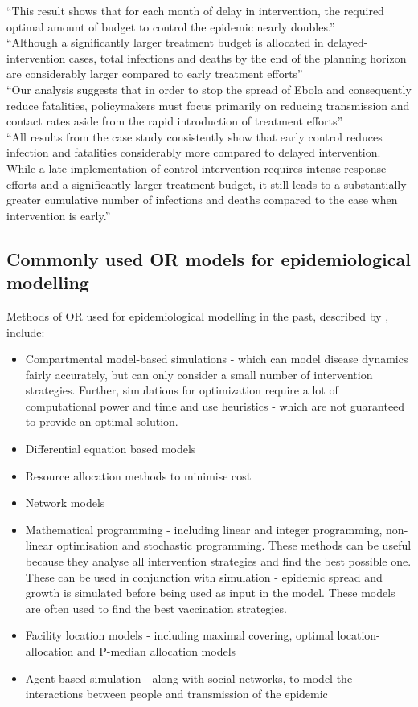 ``This result shows that for each month of delay in intervention, the required optimal amount of budget to control the epidemic nearly doubles.”\\
``Although a significantly larger treatment budget is allocated in delayed-intervention cases, total infections and deaths by the end of the planning horizon are considerably larger compared to early treatment efforts”\\
``Our analysis suggests that in order to stop the spread of Ebola and consequently reduce fatalities, policymakers must focus primarily on reducing transmission and contact rates aside from the rapid introduction of treatment efforts”\\
``All results from the case study consistently show that early control reduces infection and fatalities considerably more compared to delayed intervention. While a late implementation of control intervention requires intense response efforts and a significantly larger treatment budget, it still leads to a substantially greater cumulative number of infections and deaths compared to the case when intervention is early.”\\

\subsection{Commonly used OR models for epidemiological modelling}
Methods of OR used for epidemiological modelling in the past, described by \cite{buyuktahtakin2018new}, include:
\begin{itemize}
    \item Compartmental model-based simulations - which can model disease dynamics fairly accurately, but can only consider a small number of intervention strategies. Further, simulations for optimization require a lot of computational power and time and use heuristics - which are not guaranteed to provide an optimal solution.
    \item Differential equation based models
    \item Resource allocation methods to minimise cost
    \item Network models
    \item Mathematical programming - including linear and integer programming, non-linear optimisation and stochastic programming. These methods can be useful because they analyse all intervention strategies and find the best possible one. These can be used in conjunction with simulation - epidemic spread and growth is simulated before being used as input in the model. These models are often used to find the best vaccination strategies.
    \item Facility location models - including maximal covering, optimal location-allocation and P-median allocation models
    \item Agent-based simulation - along with social networks, to model the interactions between people and transmission of the epidemic
\end{itemize}

